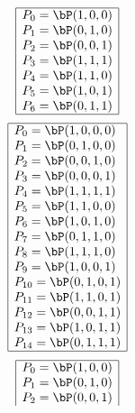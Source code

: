 \begin{table}
\begin{tcolorbox}[tabularx={X|p{2cm}|X|},enhanced,fonttitle=\bfseries\large,fontupper=\normalsize\sffamily,
colback=yellow!10!white,colframe=green!50!black,colbacktitle=blue!30!white,
coltitle=black,title=Ranking Points in Small Projective Spaces]
\begin{tcbitemize}[raster columns=3,raster equal height,
  colframe=red!75!black,colback=red!5!white,fonttitle=\bfseries]
\tcbitem[squeezed title*={$\PG(2,2)$}] 
$$
\begin{array}{|l|}
\hline
P_{0}=\bP( 1, 0, 0 )\\
P_{1}=\bP( 0, 1, 0 )\\
P_{2}=\bP( 0, 0, 1 )\\
P_{3}=\bP( 1, 1, 1 )\\
P_{4}=\bP( 1, 1, 0 )\\
P_{5}=\bP( 1, 0, 1 )\\
P_{6}=\bP( 0, 1, 1 )\\
\hline
\end{array}
$$
\tcbitem[squeezed title*={$\PG(3,2)$}] 
$$
\begin{array}{|l|}
\hline
P_{0}=\bP( 1, 0, 0, 0 )\\
P_{1}=\bP( 0, 1, 0, 0 )\\
P_{2}=\bP( 0, 0, 1, 0 )\\
P_{3}=\bP( 0, 0, 0, 1 )\\
P_{4}=\bP( 1, 1, 1, 1 )\\
P_{5}=\bP( 1, 1, 0, 0 )\\
P_{6}=\bP( 1, 0, 1, 0 )\\
P_{7}=\bP( 0, 1, 1, 0 )\\
P_{8}=\bP( 1, 1, 1, 0 )\\
P_{9}=\bP( 1, 0, 0, 1 )\\
P_{10}=\bP( 0, 1, 0, 1 )\\
P_{11}=\bP( 1, 1, 0, 1 )\\
P_{12}=\bP( 0, 0, 1, 1 )\\
P_{13}=\bP( 1, 0, 1, 1 )\\
P_{14}=\bP( 0, 1, 1, 1 )\\
\hline
\end{array}
$$
\tcbitem[squeezed title*={$\PG(2,3)$}] 
$$
\begin{array}{|l|}
\hline
P_{0}=\bP( 1, 0, 0 )\\
P_{1}=\bP( 0, 1, 0 )\\
P_{2}=\bP( 0, 0, 1 )\\

\end{array}$$
\end{tcbitemize}
\end{tcolorbox}
\end{table}
